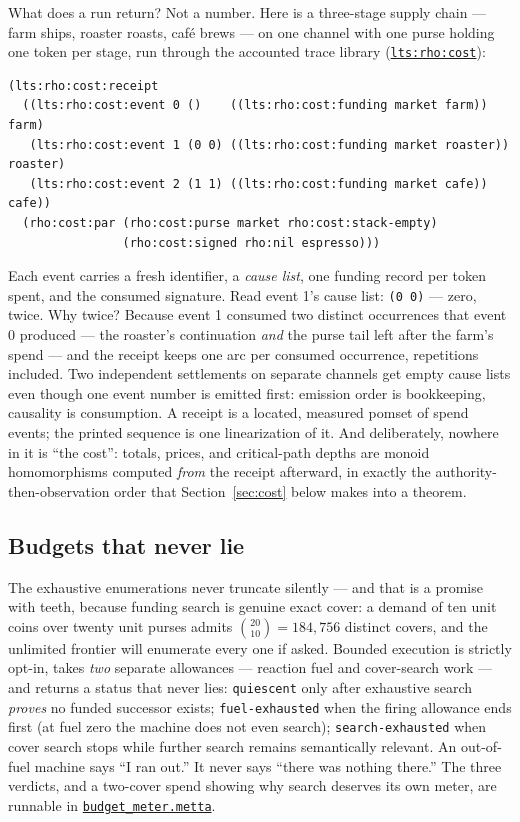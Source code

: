 \documentclass[11pt]{article}
\newcommand{\cettafile}[2]{\href{https://github.com/zariuq/CeTTa/blob/main/#1}{\code{#2}}}
\newcommand{\code}[1]{\texttt{#1}}
\begin{document}
What does a run return?  Not a number.  Here is a three-stage supply
chain --- farm ships, roaster roasts, caf\'e brews --- on one channel
with one purse holding one token per stage, run through the accounted
trace library (\cettafile{lib/lts/rho/cost.metta}{lts:rho:cost}):

\begin{lstlisting}
(lts:rho:cost:receipt
  ((lts:rho:cost:event 0 ()    ((lts:rho:cost:funding market farm))    farm)
   (lts:rho:cost:event 1 (0 0) ((lts:rho:cost:funding market roaster)) roaster)
   (lts:rho:cost:event 2 (1 1) ((lts:rho:cost:funding market cafe))    cafe))
  (rho:cost:par (rho:cost:purse market rho:cost:stack-empty)
                (rho:cost:signed rho:nil espresso)))
\end{lstlisting}

\noindent
Each event carries a fresh identifier, a \emph{cause list}, one funding
record per token spent, and the consumed signature.  Read event 1's
cause list: \code{(0 0)} --- zero, twice.  Why twice?  Because event 1
consumed two distinct occurrences that event 0 produced --- the
roaster's continuation \emph{and} the purse tail left after the farm's
spend --- and the receipt keeps one arc per consumed occurrence,
repetitions included.  Two independent settlements on separate channels
get empty cause lists even though one event number is emitted first:
emission order is bookkeeping, causality is consumption.  A receipt is a
located, measured pomset of spend events; the printed sequence is one
linearization of it.  And deliberately, nowhere in it is ``the cost'':
totals, prices, and critical-path depths are monoid homomorphisms
computed \emph{from} the receipt afterward, in exactly the
authority-then-observation order that Section~\ref{sec:cost} below makes
into a theorem.

\subsection{Budgets that never lie}

The exhaustive enumerations never truncate silently --- and that is a
promise with teeth, because funding search is genuine exact cover: a
demand of ten unit coins over twenty unit purses admits
$\binom{20}{10} = 184{,}756$ distinct covers, and the unlimited frontier
will enumerate every one if asked.  Bounded execution is strictly
opt-in, takes \emph{two} separate allowances --- reaction fuel and
cover-search work --- and returns a status that never lies:
\code{quiescent} only after exhaustive search \emph{proves} no funded
successor exists; \code{fuel-exhausted} when the firing allowance ends
first (at fuel zero the machine does not even search);
\code{search-exhausted} when cover search stops while further search
remains semantically relevant.  An out-of-fuel machine says ``I ran
out.''  It never says ``there was nothing there.''  The three verdicts,
and a two-cover spend showing why search deserves its own meter, are
runnable in
\cettafile{examples/rho/cost/budget_meter.metta}{budget\_meter.metta}.
\end{document}
